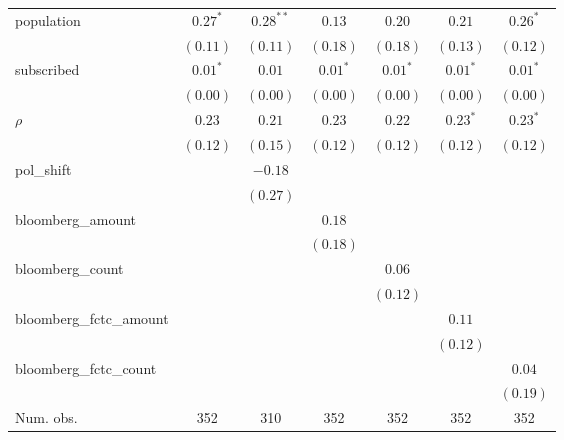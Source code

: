 \begin{table}[!h]
\begin{center}
\begin{tabular}{l c c c c c c }
population              & $0.27^{*}$   & $0.28^{**}$  & $0.13$       & $0.20$       & $0.21$       & $0.26^{*}$   \\
                        & $(0.11)$     & $(0.11)$     & $(0.18)$     & $(0.18)$     & $(0.13)$     & $(0.12)$     \\
subscribed              & $0.01^{*}$   & $0.01$       & $0.01^{*}$   & $0.01^{*}$   & $0.01^{*}$   & $0.01^{*}$   \\
                        & $(0.00)$     & $(0.00)$     & $(0.00)$     & $(0.00)$     & $(0.00)$     & $(0.00)$     \\
$\rho$                  & $0.23$       & $0.21$       & $0.23$       & $0.22$       & $0.23^{*}$   & $0.23^{*}$   \\
                        & $(0.12)$     & $(0.15)$     & $(0.12)$     & $(0.12)$     & $(0.12)$     & $(0.12)$     \\
pol\_shift              &              & $-0.18$      &              &              &              &              \\
                        &              & $(0.27)$     &              &              &              &              \\
bloomberg\_amount       &              &              & $0.18$       &              &              &              \\
                        &              &              & $(0.18)$     &              &              &              \\
bloomberg\_count        &              &              &              & $0.06$       &              &              \\
                        &              &              &              & $(0.12)$     &              &              \\
bloomberg\_fctc\_amount &              &              &              &              & $0.11$       &              \\
                        &              &              &              &              & $(0.12)$     &              \\
bloomberg\_fctc\_count  &              &              &              &              &              & $0.04$       \\
                        &              &              &              &              &              & $(0.19)$     \\
\midrule
Num. obs.               & 352          & 310          & 352          & 352          & 352          & 352          \\

\end{tabular}
\end{center}
\end{table}
